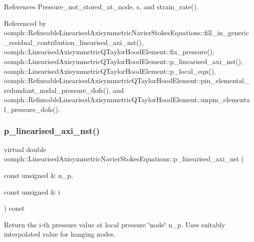 References Pressure\+\_\+not\+\_\+stored\+\_\+at\+\_\+node, s, and strain\+\_\+rate().



Referenced by oomph\+::\+Refineable\+Linearised\+Axisymmetric\+Navier\+Stokes\+Equations\+::fill\+\_\+in\+\_\+generic\+\_\+residual\+\_\+contribution\+\_\+linearised\+\_\+axi\+\_\+nst(), oomph\+::\+Linearised\+Axisymmetric\+Q\+Taylor\+Hood\+Element\+::fix\+\_\+pressure(), oomph\+::\+Linearised\+Axisymmetric\+Q\+Taylor\+Hood\+Element\+::p\+\_\+linearised\+\_\+axi\+\_\+nst(), oomph\+::\+Linearised\+Axisymmetric\+Q\+Taylor\+Hood\+Element\+::p\+\_\+local\+\_\+eqn(), oomph\+::\+Refineable\+Linearised\+Axisymmetric\+Q\+Taylor\+Hood\+Element\+::pin\+\_\+elemental\+\_\+redundant\+\_\+nodal\+\_\+pressure\+\_\+dofs(), and oomph\+::\+Refineable\+Linearised\+Axisymmetric\+Q\+Taylor\+Hood\+Element\+::unpin\+\_\+elemental\+\_\+pressure\+\_\+dofs().

\mbox{\label{classoomph_1_1LinearisedAxisymmetricNavierStokesEquations_aed0485a01052ffe2a5c9f36d6dd07da4}} 
\subsubsection{\texorpdfstring{p\+\_\+linearised\+\_\+axi\+\_\+nst()}{p\_linearised\_axi\_nst()}}
{\footnotesize\ttfamily virtual double oomph\+::\+Linearised\+Axisymmetric\+Navier\+Stokes\+Equations\+::p\+\_\+linearised\+\_\+axi\+\_\+nst (\begin{DoxyParamCaption}\item[{const unsigned \&}]{n\+\_\+p,  }\item[{const unsigned \&}]{i }\end{DoxyParamCaption}) const\hspace{0.3cm}{\ttfamily [pure virtual]}}



Return the i-\/th pressure value at local pressure \char`\"{}node\char`\"{} n\+\_\+p. Uses suitably interpolated value for hanging nodes. 




